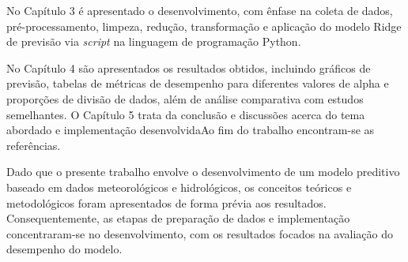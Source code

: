 No Capítulo 3 é apresentado o desenvolvimento, com ênfase na coleta de dados, pré-processamento, limpeza, redução, transformação e aplicação do modelo Ridge de previsão via \textit{script} na linguagem de programação Python.

No Capítulo 4 são apresentados os resultados obtidos, incluindo gráficos de previsão, tabelas de métricas de desempenho para diferentes valores de alpha e proporções de divisão de dados, além de análise comparativa com estudos semelhantes. O Capítulo 5 trata da conclusão e discussões acerca do tema abordado e implementação desenvolvidaAo fim do trabalho encontram-se as referências.

Dado que o presente trabalho envolve o desenvolvimento de um modelo preditivo baseado em dados meteorológicos e hidrológicos, os conceitos teóricos e metodológicos foram apresentados de forma prévia aos resultados. Consequentemente, as etapas de preparação de dados e implementação concentraram-se no desenvolvimento, com os resultados focados na avaliação do desempenho do modelo.